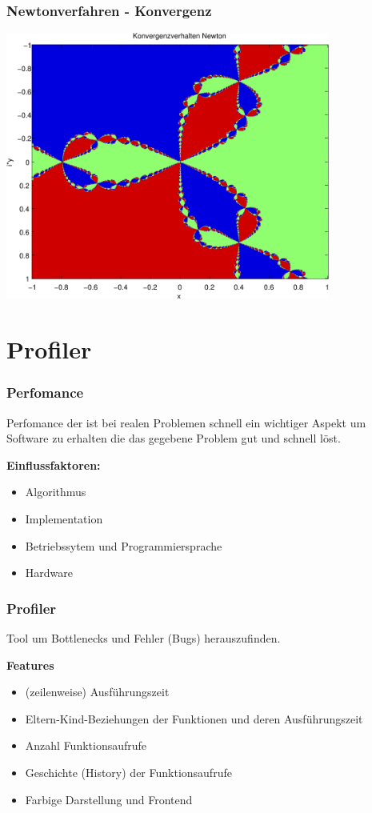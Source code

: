 \documentclass[hyperref={xetex}]{beamer}
\begin{document}
\begin{frame}[fragile]\frametitle{Newtonverfahren - Konvergenz}
\begin{center}
 \includegraphics[width=0.8\textwidth]{figures/newton_konvergenz.pdf}
\end{center}
\end{frame}

\section{Profiler}

\begin{frame}[fragile]\frametitle{Perfomance}

Perfomance der ist bei realen Problemen schnell ein wichtiger Aspekt um Software zu erhalten die das gegebene Problem gut und schnell löst.

\textbf{Einflussfaktoren:}
\begin{itemize}
 \item Algorithmus
 \item \alert{Implementation}
 \item Betriebssytem und Programmiersprache
 \item Hardware
\end{itemize}

\end{frame}

\begin{frame}[fragile]\frametitle{Profiler}
Tool um Bottlenecks und Fehler (Bugs) herauszufinden.

\textbf{Features}
\begin{itemize}
 \item (zeilenweise) Ausführungszeit
\item Eltern-Kind-Beziehungen der Funktionen und deren Ausführungszeit
 \item Anzahl Funktionsaufrufe
\item Geschichte (History) der Funktionsaufrufe
\item Farbige Darstellung und Frontend
\end{itemize}

\end{frame}
\end{document}
